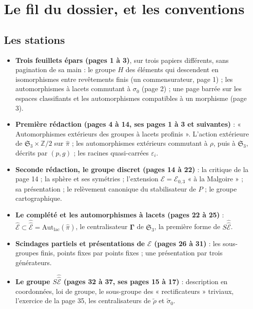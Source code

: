 \documentclass[11pt,a4paper]{article}
\begin{document}
\section*{Le fil du dossier, et les conventions}

\subsection*{Les stations}

\begin{itemize}
\item \textbf{Trois feuillets épars (pages 1 à 3)}, sur trois papiers
différents, sans pagination de sa main : le groupe $H$ des éléments qui
descendent en isomorphismes entre revêtements finis (un commensurateur,
page 1) ; les automorphismes à lacets commutant à $\sigma_0$ (page 2) ; une
page barrée sur les espaces classifiants et les automorphismes compatibles à
un morphisme (page 3).
\item \textbf{Première rédaction (pages 4 à 14, ses pages 1 à 3 et suivantes)} :
« Automorphismes extérieurs des groupes à lacets profinis ». L'action
extérieure de $\mathfrak{S}_3 \times \mathbb{Z}/2$ sur $\widehat{\pi}$ ; les
automorphismes extérieurs commutant à $\rho$, puis à $\mathfrak{S}_3$, décrits
par $(p, g)$ ; les racines quasi-carrées $\varepsilon_i$.
\item \textbf{Seconde rédaction, le groupe discret (pages 14 à 22)} : la
critique de la page 14 ; la sphère et ses symétries ; l'extension
$\mathcal{E} = \mathcal{E}_{0,3}$ « à la Malgoire » ; sa présentation ; le
relèvement canonique du stabilisateur de $P$ ; le groupe cartographique.
\item \textbf{Le complété et les automorphismes à lacets (pages 22 à 25)} :
$\widehat{\mathcal{E}} \subset \hat{\hat{\mathcal{E}}} =
\mathrm{Aut}_{\mathrm{lac}}(\widehat{\pi})$, le centralisateur
$\boldsymbol{\Gamma}$ de $\mathfrak{S}_3$, la première forme de
$S\hat{\hat{\mathcal{E}}}$.
\item \textbf{Scindages partiels et présentations de $\mathcal{E}$ (pages 26 à
31)} : les sous-groupes finis, points fixes par points fixes ; une
présentation par trois générateurs.
\item \textbf{Le groupe $S\hat{\hat{\mathcal{E}}}$ (pages 32 à 37, ses pages 15 à
17)} : description en coordonnées, loi de groupe, le sous-groupe des
« rectificateurs » triviaux, l'exercice de la page 35, les centralisateurs de
$\tilde\rho$ et $\tilde\sigma_0$.
\end{itemize}
\end{document}
